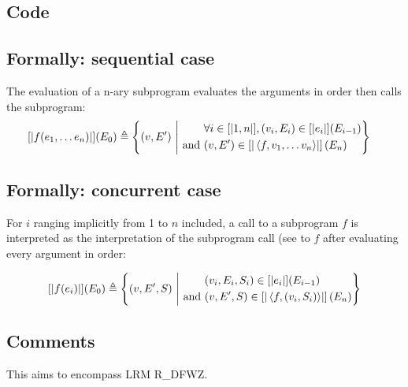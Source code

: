 \documentclass{book}
\begin{document}
  \subsection{Code}

\begin{formal}
  \subsection{Formally: sequential case}
  The evaluation of a n-ary subprogram evaluates the arguments in order then
  calls the subprogram:
  \begin{align}
  \left[| f (e_1, \dotsc e_n) \right|] (E_0) & \triangleq
    \left\{ (v, E') \ \middle|\ {}
    \begin{aligned}
      & \forall i \in [| 1, n |], (v_i, E_i) \in \left[| e_i \right|] (E_{i - 1})
      \\ \text{and}\ &
      (v, E') \in \left[| \left\langle f, v_1, \dotsc v_n \right\rangle \right|] \left(E_n\right)
    \end{aligned}
    \right\}
  \label{eq:sem-seq-fcall}
  \end{align} 

  \subsection{Formally: concurrent case}
  For $i$ ranging implicitly from 1 to $n$ included, a call to a subprogram $f$
  is interpreted as the interpretation of the subprogram call (see to $f$ after
  evaluating every argument in order:

  \begin{align}
    \interp{f (e_i)} (E_0) \triangleq
      \left\{ (v, E', S) \st{}
      \begin{aligned}
        & %
          (v_i, E_i, S_i) \in \interp{e_i} (E_{i - 1})
        \\ \text{and}\ &
        (v, E', S) \in \interp{\left\langle f, (v_i,S_i) \right\rangle} \left(E_n\right)
      \end{aligned}
      \right\}
    \label{eq:sem-conc-fcall}
  \end{align}
\end{formal}

  \subsection{Comments}
  This aims to encompass LRM R\_DFWZ.
\end{document}
